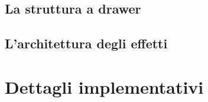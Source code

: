         \subsection{La struttura a drawer}\label{sub:drawer}
        \subsection{L'architettura degli effetti}\label{sub:effetti}
    \section{Dettagli implementativi}\label{sec:dettagli}
